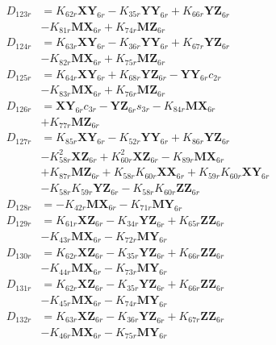 \begin{align}
D_{123r} &= K_{62r}\mathbf{XY}_{6r} - K_{35r}\mathbf{YY}_{6r} + K_{66r}\mathbf{YZ}_{6r}  \nonumber \\
&- K_{81r}\mathbf{MX}_{6r} + K_{74r}\mathbf{MZ}_{6r} \nonumber \\
D_{124r} &= K_{63r}\mathbf{XY}_{6r} - K_{36r}\mathbf{YY}_{6r} + K_{67r}\mathbf{YZ}_{6r}  \nonumber \\
&- K_{82r}\mathbf{MX}_{6r} + K_{75r}\mathbf{MZ}_{6r} \nonumber \\
D_{125r} &= K_{64r}\mathbf{XY}_{6r} + K_{68r}\mathbf{YZ}_{6r} - \mathbf{YY}_{6r}c_{2r}  \nonumber \\
&- K_{83r}\mathbf{MX}_{6r} + K_{76r}\mathbf{MZ}_{6r} \nonumber \\
D_{126r} &= \mathbf{XY}_{6r}c_{3r} - \mathbf{YZ}_{6r}s_{3r} - K_{84r}\mathbf{MX}_{6r}  \nonumber \\
&+ K_{77r}\mathbf{MZ}_{6r} \nonumber \\
D_{127r} &= K_{85r}\mathbf{XY}_{6r} - K_{52r}\mathbf{YY}_{6r} + K_{86r}\mathbf{YZ}_{6r}  \nonumber \\
&- K_{58r}^2\mathbf{XZ}_{6r} + K_{60r}^2\mathbf{XZ}_{6r} - K_{89r}\mathbf{MX}_{6r}  \nonumber \\
&+ K_{87r}\mathbf{MZ}_{6r} + K_{58r}K_{60r}\mathbf{XX}_{6r} + K_{59r}K_{60r}\mathbf{XY}_{6r}  \nonumber \\
&- K_{58r}K_{59r}\mathbf{YZ}_{6r} - K_{58r}K_{60r}\mathbf{ZZ}_{6r} \nonumber \\
D_{128r} &= - K_{42r}\mathbf{MX}_{6r} - K_{71r}\mathbf{MY}_{6r} \nonumber \\
D_{129r} &= K_{61r}\mathbf{XZ}_{6r} - K_{34r}\mathbf{YZ}_{6r} + K_{65r}\mathbf{ZZ}_{6r}  \nonumber \\
&- K_{43r}\mathbf{MX}_{6r} - K_{72r}\mathbf{MY}_{6r} \nonumber \\
D_{130r} &= K_{62r}\mathbf{XZ}_{6r} - K_{35r}\mathbf{YZ}_{6r} + K_{66r}\mathbf{ZZ}_{6r}  \nonumber \\
&- K_{44r}\mathbf{MX}_{6r} - K_{73r}\mathbf{MY}_{6r} \nonumber \\
D_{131r} &= K_{62r}\mathbf{XZ}_{6r} - K_{35r}\mathbf{YZ}_{6r} + K_{66r}\mathbf{ZZ}_{6r}  \nonumber \\
&- K_{45r}\mathbf{MX}_{6r} - K_{74r}\mathbf{MY}_{6r} \nonumber \\
D_{132r} &= K_{63r}\mathbf{XZ}_{6r} - K_{36r}\mathbf{YZ}_{6r} + K_{67r}\mathbf{ZZ}_{6r}  \nonumber \\
&- K_{46r}\mathbf{MX}_{6r} - K_{75r}\mathbf{MY}_{6r} \nonumber \\

\end{align}
